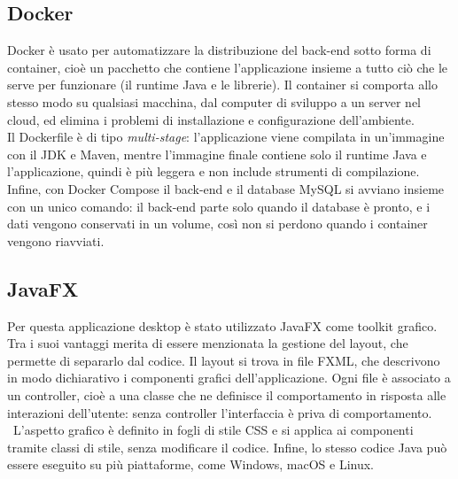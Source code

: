 \subsection{Docker}
Docker è usato per automatizzare la distribuzione del back-end sotto forma di container, cioè un pacchetto che contiene l'applicazione insieme a tutto ciò che le serve per funzionare (il runtime Java e le librerie). Il container si comporta allo stesso modo su qualsiasi macchina, dal computer di sviluppo a un server nel cloud, ed elimina i problemi di installazione e configurazione dell'ambiente. \\
\indent Il Dockerfile è di tipo \textit{multi-stage}: l'applicazione viene compilata in un'immagine con il JDK e Maven, mentre l'immagine finale contiene solo il runtime Java e l'applicazione, quindi è più leggera e non include strumenti di compilazione. Infine, con Docker Compose il back-end e il database MySQL si avviano insieme con un unico comando: il back-end parte solo quando il database è pronto, e i dati vengono conservati in un volume, così non si perdono quando i container vengono riavviati.

\subsection{JavaFX}
Per questa applicazione desktop è stato utilizzato JavaFX come toolkit grafico. Tra i suoi vantaggi merita di essere menzionata la gestione del layout, che permette di separarlo dal codice. Il layout si trova in file FXML, che descrivono in modo dichiarativo i componenti grafici dell’applicazione. Ogni file è associato a un controller, cioè a una classe che ne definisce il comportamento in risposta alle interazioni dell’utente: senza controller l’interfaccia è priva di comportamento. \\\
\indent L’aspetto grafico è definito in fogli di stile CSS e si applica ai componenti tramite classi di stile, senza modificare il codice. Infine, lo stesso codice Java può essere eseguito su più piattaforme, come Windows, macOS e Linux.

